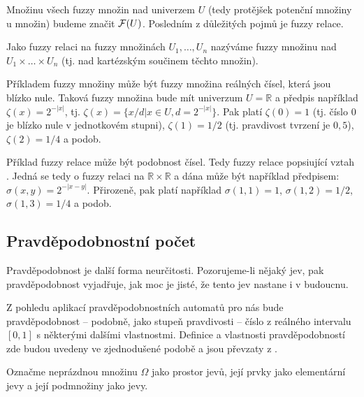 Množinu všech fuzzy množin nad univerzem $U$ (tedy protějšek potenční množiny u  množin) budeme značit $\mathcal{F}(U)$. Posledním z důležitých pojmů je fuzzy relace.

\begin{definition}
 Jako fuzzy relaci na fuzzy množinách $U_1, \dots, U_n$ nazýváme fuzzy množinu nad $U_1 \times \dots \times U_n$ (tj. nad kartézským součinem těchto množin).
\end{definition}

\begin{example}
  Příkladem fuzzy množiny může být fuzzy množina reálných čísel, která jsou blízko nule. Taková fuzzy množina bude mít univerzum $U = \mathbb
  {R}$ a předpis například $\zeta(x) = 2^{-|x|}$, tj. $\zeta(x) = \{ x/d | x \in U, d = 2^{-|x|} \}$. Pak platí $\zeta(0) = 1$ (tj. číslo $0$ je blízko nule v jednotkovém stupni), $\zeta(1) = 1/2$ (tj. pravdivost tvrzení  je $0{,}5$), $\zeta(2) = 1/4$ a podob.
  
  Příklad fuzzy relace může být podobnost čísel. Tedy fuzzy relace popsiující vztah . Jedná se tedy o fuzzy relaci na $\mathbb{R} \times \mathbb{R}$ a dána může být například předpisem: $\sigma(x, y) = 2^{-|x-y|}$. Přirozeně, pak platí například $\sigma(1, 1) = 1$, $\sigma(1, 2) = 1/2$, $\sigma(1, 3) = 1/4$ a podob.
\end{example}

\subsection{Pravděpodobnostní počet}
Pravděpodobnost je další forma neurčitosti. Pozorujeme-li nějaký jev, pak pravděpodobnost vyjadřuje, jak moc je jisté, že tento jev nastane i v budoucnu. 

Z pohledu aplikací pravděpodobnostních automatů pro nás bude pravděpodobnost -- podobně, jako stupeň pravdivosti -- číslo z reálného intervalu $[0, 1]$ s některými dalšími vlastnostmi. Definice a vlastnosti pravděpodobností zde budou uvedeny ve zjednodušené podobě a jsou převzaty z \cite{Joh-ProbStaComSci}. 

\begin{definition}
  Označme neprázdnou množinu $\Omega$ jako prostor jevů, její prvky jako elementární jevy a její podmnožiny jako jevy.  
\end{definition}

